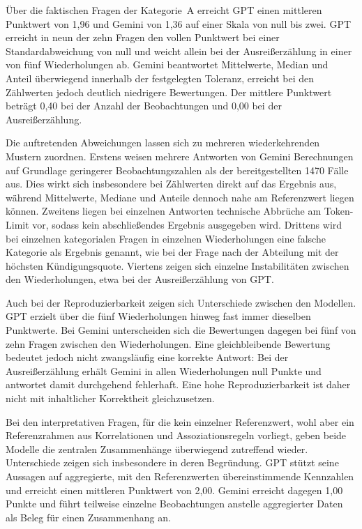 Über die faktischen Fragen der Kategorie~A erreicht GPT einen mittleren Punktwert von 1,96 und Gemini von 1,36 auf einer Skala von null bis zwei. GPT erreicht in neun der zehn Fragen den vollen Punktwert bei einer Standardabweichung von null und weicht allein bei der Ausreißerzählung in einer von fünf Wiederholungen ab. Gemini beantwortet Mittelwerte, Median und Anteil überwiegend innerhalb der festgelegten Toleranz, erreicht bei den Zählwerten jedoch deutlich niedrigere Bewertungen. Der mittlere Punktwert beträgt 0,40 bei der Anzahl der Beobachtungen und 0,00 bei der Ausreißerzählung.

Die auftretenden Abweichungen lassen sich zu mehreren wiederkehrenden Mustern zuordnen. Erstens weisen mehrere Antworten von Gemini Berechnungen auf Grundlage geringerer Beobachtungszahlen als der bereitgestellten 1470 Fälle aus. Dies wirkt sich insbesondere bei Zählwerten direkt auf das Ergebnis aus, während Mittelwerte, Mediane und Anteile dennoch nahe am Referenzwert liegen können. Zweitens liegen bei einzelnen Antworten technische Abbrüche am Token-Limit vor, sodass kein abschließendes Ergebnis ausgegeben wird. Drittens wird bei einzelnen kategorialen Fragen in einzelnen Wiederholungen eine falsche Kategorie als Ergebnis genannt, wie bei der Frage nach der Abteilung mit der höchsten Kündigungsquote. Viertens zeigen sich einzelne Instabilitäten zwischen den Wiederholungen, etwa bei der Ausreißerzählung von GPT.

Auch bei der Reproduzierbarkeit zeigen sich Unterschiede zwischen den Modellen. GPT erzielt über die fünf Wiederholungen hinweg fast immer dieselben Punktwerte. Bei Gemini unterscheiden sich die Bewertungen dagegen bei fünf von zehn Fragen zwischen den Wiederholungen. Eine gleichbleibende Bewertung bedeutet jedoch nicht zwangsläufig eine korrekte Antwort: Bei der Ausreißerzählung erhält Gemini in allen Wiederholungen null Punkte und antwortet damit durchgehend fehlerhaft. Eine hohe Reproduzierbarkeit ist daher nicht mit inhaltlicher Korrektheit gleichzusetzen. 

Bei den interpretativen Fragen, für die kein einzelner Referenzwert, wohl aber ein Referenzrahmen aus Korrelationen und Assoziationsregeln vorliegt, geben beide Modelle die zentralen Zusammenhänge überwiegend zutreffend wieder. Unterschiede zeigen sich insbesondere in deren Begründung. GPT stützt seine Aussagen auf aggregierte, mit den Referenzwerten übereinstimmende Kennzahlen und erreicht einen mittleren Punktwert von 2,00. Gemini erreicht dagegen 1,00 Punkte und führt teilweise einzelne Beobachtungen anstelle aggregierter Daten als Beleg für einen Zusammenhang an.

